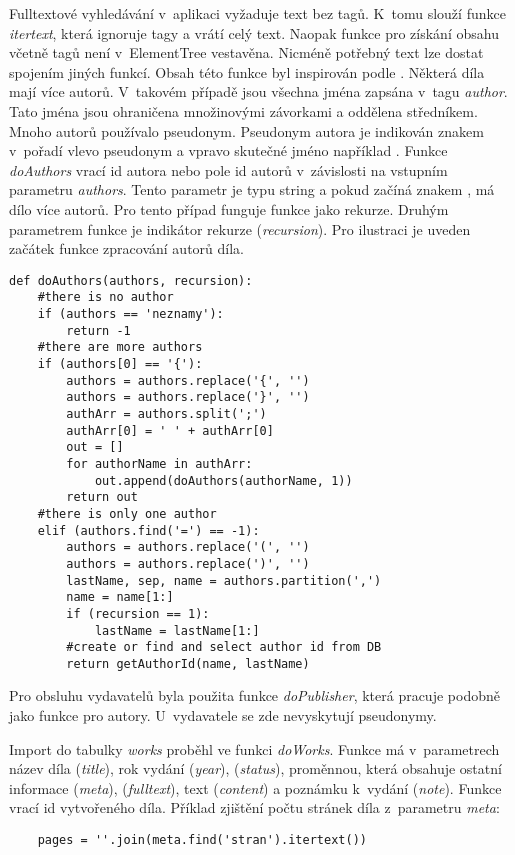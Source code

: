             Fulltextové vyhledávání v~aplikaci vyžaduje text bez tagů. K~tomu slouží funkce \textit{itertext}, která ignoruje tagy a vrátí celý text. Naopak funkce pro získání obsahu včetně tagů není v~ElementTree vestavěna. Nicméně potřebný text lze dostat spojením jiných funkcí. Obsah této funkce byl inspirován podle \cite{fn01}. 
            Některá díla mají více autorů. V~takovém případě jsou všechna jména zapsána v~tagu \textit{author}. Tato jména jsou ohraničena množinovými závorkami a oddělena středníkem. Mnoho autorů používalo pseudonym. Pseudonym autora je indikován znakem \uv{=} v~pořadí vlevo pseudonym a vpravo skutečné jméno například . Funkce \textit{doAuthors} vrací id autora nebo pole id autorů v~závislosti na vstupním parametru \textit{authors}. Tento parametr je typu string a pokud začíná znakem \uv{\{}, má dílo více autorů. Pro tento případ funguje funkce jako rekurze. Druhým parametrem funkce je indikátor rekurze (\textit{recursion}).
            Pro ilustraci je uveden začátek funkce zpracování autorů díla.
             \begin{verbatim}
def doAuthors(authors, recursion):
    #there is no author
    if (authors == 'neznamy'):
        return -1
    #there are more authors
    if (authors[0] == '{'):
        authors = authors.replace('{', '')
        authors = authors.replace('}', '')
        authArr = authors.split(';')
        authArr[0] = ' ' + authArr[0]
        out = []
        for authorName in authArr:
            out.append(doAuthors(authorName, 1))
        return out
    #there is only one author 
    elif (authors.find('=') == -1):
        authors = authors.replace('(', '')
        authors = authors.replace(')', '')
        lastName, sep, name = authors.partition(',')
        name = name[1:]
        if (recursion == 1):
            lastName = lastName[1:]
        #create or find and select author id from DB    
        return getAuthorId(name, lastName)
             \end{verbatim}
            
            Pro obsluhu vydavatelů byla použita funkce \textit{doPublisher}, která pracuje podobně jako funkce pro autory. U~vydavatele se zde nevyskytují pseudonymy. 
            
            Import do tabulky \textit{works} proběhl ve funkci \textit{doWorks}. Funkce má v~parametrech název díla (\textit{title}), rok vydání (\textit{year}), (\textit{status}), proměnnou, která obsahuje ostatní informace (\textit{meta}), (\textit{fulltext}), text (\textit{content}) a poznámku k~vydání (\textit{note}). Funkce vrací id vytvořeného díla. Příklad zjištění počtu stránek díla z~parametru \textit{meta}:
            \begin{lstlisting}
    pages = ''.join(meta.find('stran').itertext())
            \end{lstlisting}
            

